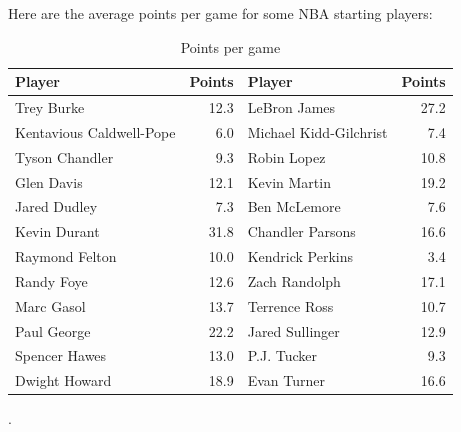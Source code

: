 \documentclass[letterpaper, landscape]{exam}
\begin{document}
\begin{questions}
\begin{parts}
      \end{parts}

    \question\label{q:point.histogram}
      Here are the average points per game for some NBA starting players:

      \begin{table}[ht]
        \centering
        \begin{tabular}{lrlr}
          \toprule
          Player                   & Points & Player                 & Points\\
          \midrule
          Trey Burke               & 12.3   & LeBron James           & 27.2 \\
          Kentavious Caldwell-Pope & 6.0    & Michael Kidd-Gilchrist & 7.4 \\
          Tyson Chandler           & 9.3    & Robin Lopez            & 10.8 \\
          Glen Davis               & 12.1   & Kevin Martin           & 19.2 \\
          Jared Dudley             & 7.3    & Ben McLemore           & 7.6 \\
          Kevin Durant             & 31.8   & Chandler Parsons       & 16.6 \\
          Raymond Felton           & 10.0   & Kendrick Perkins       & 3.4 \\
          Randy Foye               & 12.6   & Zach Randolph          & 17.1 \\
          Marc Gasol               & 13.7   & Terrence Ross          & 10.7 \\
          Paul George              & 22.2   & Jared Sullinger        & 12.9 \\
          Spencer Hawes            & 13.0   & P.J. Tucker            & 9.3 \\
          Dwight Howard            & 18.9   & Evan Turner            & 16.6 \\
          \bottomrule
        \end{tabular}
        \caption{Points per game}.
      \end{table}

\end{questions}
\end{document}
